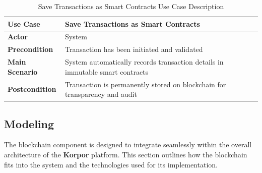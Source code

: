 \begin{table}[htbp]
    \centering
    \begin{tabular}{|p{3cm}|p{10cm}|}
        \hline
        \textbf{Use Case} & \textbf{Save Transactions as Smart Contracts} \\
        \hline
        \textbf{Actor} & System \\
        \hline
        \textbf{Precondition} & Transaction has been initiated and validated \\
        \hline
        \textbf{Main Scenario} & System automatically records transaction details in immutable smart contracts \\
        \hline
        \textbf{Postcondition} & Transaction is permanently stored on blockchain for transparency and audit \\
        \hline
    \end{tabular}
    \caption{Save Transactions as Smart Contracts Use Case Description}
    \label{tab:save-transactions-use-case}
\end{table}

\subsection{Modeling}

The blockchain component is designed to integrate seamlessly within the overall architecture of the \textbf{\textcolor{primary}{Korpor}} platform. This section outlines how the blockchain fits into the system and the technologies used for its implementation.


